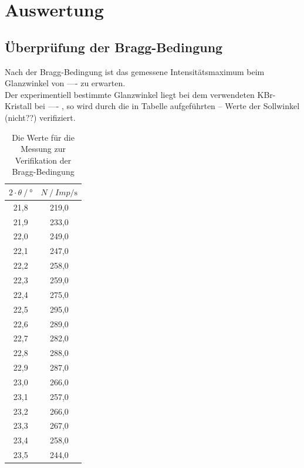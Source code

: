 \section{Auswertung}
\label{sec:Auswertung}



\subsection{Überprüfung der Bragg-Bedingung}
\label{subsec:bragg}
Nach der Bragg-Bedingung ist das gemessene Intensitätsmaximum beim Glanzwinkel von ---- zu erwarten. \\
Der experimentiell bestimmte Glanzwinkel liegt bei dem verwendeten KBr-Kristall bei ---- , so wird durch die in Tabelle aufgeführten -- Werte 
der Sollwinkel (nicht??) verifiziert. \\

\begin{table}[H]
  \centering
  \caption{Die Werte für die Messung zur Verifikation der Bragg-Bedingung }
  \begin{tabular}{cc}
    \toprule
    {$ 2 \cdot \theta \mathbin{/} \unit{\degree}$} &
    {$ N \mathbin{/} Imp / \unit{\second}$} \\
    \midrule
    21,8 &	219,0 \\
    21,9 &	233,0 \\
    22,0 &	249,0 \\
    22,1 &	247,0 \\
    22,2 &	258,0 \\
    22,3 &	259,0 \\
    22,4 &	275,0 \\
    22,5 &	295,0 \\
    22,6 &	289,0 \\
    22,7 &	282,0 \\
    22,8 &	288,0 \\
    22,9 &	287,0 \\
    23,0 &	266,0 \\
    23,1 &	257,0 \\
    23,2 &	266,0 \\
    23,3 &	267,0 \\
    23,4 &	258,0 \\
    23,5 &	244,0 \\


    \bottomrule
  \end{tabular}
  \label{tab:Tab_bragg}
\end{table}




